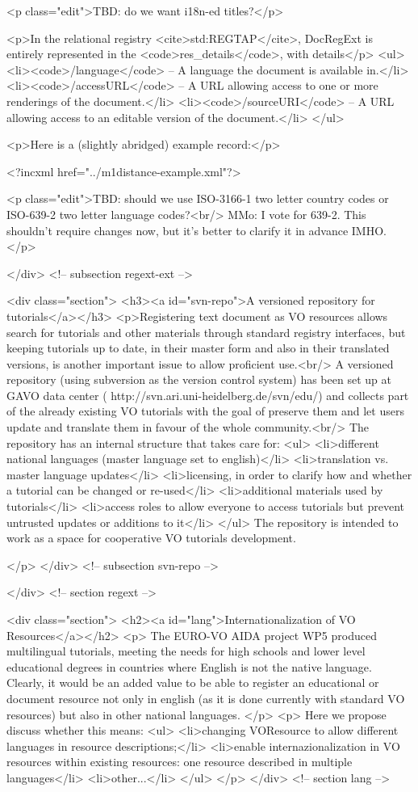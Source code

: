 <p class="edit">TBD: do we want i18n-ed titles?</p>

<p>In the relational registry <cite>std:REGTAP</cite>, DocRegExt is
entirely represented in the <code>res_details</code>, with details</p>
<ul>
<li><code>/language</code> -- A language the document is available in.</li>
<li><code>/accessURL</code> -- A URL allowing access to one or more
renderings of the document.</li>
<li><code>/sourceURI</code> -- A URL allowing access to an editable version of the document.</li>
</ul>

<p>Here is a (slightly abridged) example record:</p>

<?incxml href="../m1distance-example.xml"?>

<p class="edit">TBD: should we use ISO-3166-1 two letter 
country codes or ISO-639-2 two letter language codes?<br/>
MMo: I vote for 639-2. This shouldn't require changes now, 
but it's better to clarify it in advance IMHO.
</p>

</div> <!-- subsection regext-ext -->

<div class="section">
<h3><a id="svn-repo">A versioned repository for tutorials</a></h3>
<p>Registering text document as VO resources allows search for tutorials and other 
materials through standard registry interfaces, but keeping 
tutorials up to date, in their master form and also in their translated 
versions, is another important issue to allow proficient use.<br/>
A versioned repository (using subversion as the version control system) 
has been set up at GAVO data center (
http://svn.ari.uni-heidelberg.de/svn/edu/) and collects part of the
already existing VO tutorials with the goal of preserve them and let users 
update and translate them in favour of the whole community.<br/>
The repository has an internal structure that takes care for:
<ul>
  <li>different national languages (master language set to english)</li>
  <li>translation vs. master language updates</li>
  <li>licensing, in order to clarify how and whether a tutorial can be changed or re-used</li>
  <li>additional materials used by tutorials</li>
  <li>access roles to allow everyone to access tutorials but prevent untrusted updates or additions to it</li>
</ul>
The repository is intended to work as a space for cooperative 
VO tutorials development.

</p>
</div> <!-- subsection svn-repo -->

</div> <!-- section regext -->

<div class="section">
<h2><a id="lang">Internationalization of VO Resources</a></h2>
<p>
The EURO-VO AIDA project WP5 produced multilingual tutorials, 
meeting the needs for high schools and lower level 
educational degrees in countries where English is not the native language. 
Clearly, it would be an added value to be able to register an educational or
document resource not only in english (as it is done currently with 
standard VO resources) but also in other national languages.
</p>
<p>
Here we propose discuss whether this means:
<ul>
  <li>changing VOResource to allow different languages in resource 
  descriptions;</li>
  <li>enable internazionalization in VO resources within existing
  resources: one resource described in multiple languages</li>
  <li>other...</li>
</ul>
</p>
</div> <!-- section lang -->

